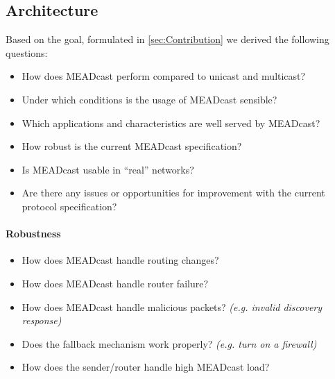 \subsection{Architecture} %
\label{sub:Architecture}




\newpage\phantom{blabla}
\newpage\phantom{blabla}
Based on the goal, formulated in \autoref{sec:Contribution} we derived the
    following questions:

\begin{itemize}
    \item How does MEADcast perform compared to unicast and multicast?
    \item Under which conditions is the usage of MEADcast sensible?
    \item Which applications and characteristics are well served by MEADcast?
    \item How robust is the current MEADcast specification?
    \item Is MEADcast usable in ``real'' networks?
    \item Are there any issues or opportunities for improvement with the
        current protocol specification?
\end{itemize}

\paragraph{Robustness} %
\label{par:Robustness}
\begin{itemize}
    \item How does MEADcast handle routing changes?
    \item How does MEADcast handle router failure?
    \item How does MEADcast handle malicious packets?
        \textit{(e.g. invalid discovery response)}
    \item Does the fallback mechanism work properly?
        \textit{(e.g. turn on a firewall)}
    \item How does the sender/router handle high MEADcast load?
\end{itemize}

